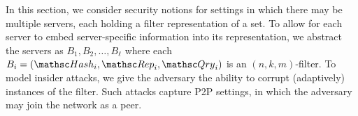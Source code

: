   In this section, we consider security notions for settings in which there may be multiple servers, each holding a filter representation of a set.  To allow for each server to embed server-specific information into its representation, we abstract the servers as $B_1,B_2,\ldots,B_\ell$ where each $B_i=(\Hash_i,\Rep_i,\Qry_i)$ is an $(n,k,m)$-filter.    To model insider attacks, we give the adversary the ability to corrupt (adaptively) instances of the filter.  Such attacks capture P2P settings, in which the adversary may join the network as a peer.

